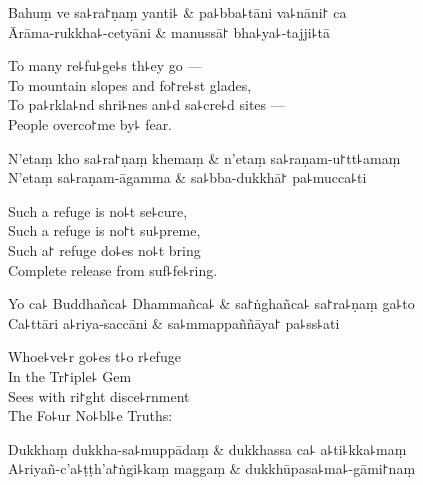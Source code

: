 \begin{twochants}
  Bahuṃ ve sa꜕ra꜓ṇaṃ yanti꜕ & pa꜕bba꜕tāni va꜕nāni꜓ ca \\
  Ārāma-rukkha꜕-cetyāni & manussā꜓ bha꜕ya꜕-tajji꜕tā \\
\end{twochants}

\begin{english}
  To many re꜕fu꜕ge꜕s th꜕ey go ---\\
  To mountain slopes and fo꜓re꜕st glades,\\
  To pa꜕rkla꜕nd shri꜕nes an꜕d sa꜕cre꜕d sites ---\\
  People overco꜓me by꜕ fear.
\end{english}

\begin{twochants}
  N'etaṃ kho sa꜕ra꜓ṇaṃ khemaṃ & n'etaṃ sa꜕raṇam-u꜓tt꜕amaṃ \\
  N'etaṃ sa꜕raṇam-āgamma & sa꜕bba-dukkhā꜓ pa꜕mucca꜕ti \\
\end{twochants}

\begin{english}
  Such a refuge is no꜕t se꜕cure,\\
  Such a refuge is no꜓t su꜕preme,\\
  Such a꜓ refuge do꜕es no꜕t bring\\
  Complete release from suf꜕fe꜕ring.
\end{english}

\begin{twochants}
  Yo ca꜕ Buddhañca꜕ Dhammañca꜕ & sa꜓ṅghañca꜕ sa꜓ra꜕ṇaṃ ga꜕to \\
  Ca꜕ttāri a꜕riya-saccāni & sa꜕mmappaññāya꜓ pa꜕ss꜕ati \\
\end{twochants}

\begin{english}
  Whoe꜕ve꜕r go꜕es t꜕o r꜕efuge\\
  In the Tr꜓iple꜕ Gem\\
  Sees with ri꜓ght disce꜕rnment\\
  The Fo꜕ur No꜕bl꜕e Truths:
\end{english}

\begin{twochants}
  Dukkhaṃ dukkha-sa꜕muppādaṃ & dukkhassa ca꜕ a꜕ti꜕kka꜕maṃ \\
  A꜕riyañ-c'a꜕ṭṭh'a꜓ṅgi꜕kaṃ maggaṃ & dukkhūpasa꜕ma꜕-gāmi꜓naṃ \\
\end{twochants}

